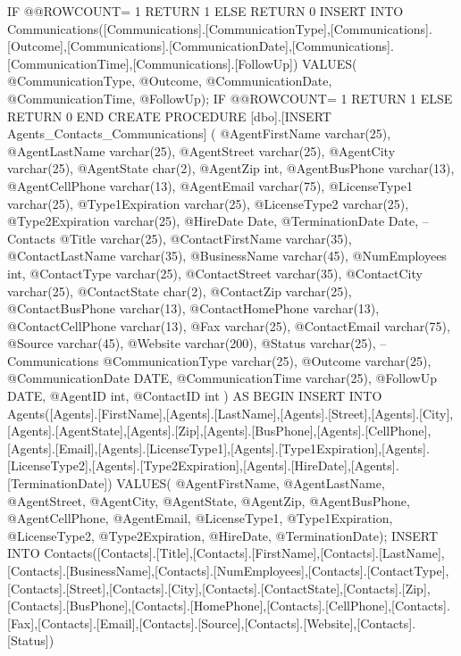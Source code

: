 	IF @@ROWCOUNT= 1
				RETURN 1
			ELSE
				RETURN 0
INSERT INTO	Communications([Communications].[CommunicationType],[Communications].[Outcome],[Communications].[CommunicationDate],[Communications].[CommunicationTime],[Communications].[FollowUp])	
	VALUES(				   @CommunicationType,                  @Outcome,                  @CommunicationDate,                  @CommunicationTime,                  @FollowUp);             			
			IF @@ROWCOUNT= 1
				RETURN 1
			ELSE
				RETURN 0
END
CREATE PROCEDURE [dbo].[INSERT Agents_Contacts_Communications]
(	
	@AgentFirstName varchar(25),
	@AgentLastName varchar(25),
	@AgentStreet varchar(25),
	@AgentCity varchar(25),
	@AgentState char(2),
	@AgentZip int,
	@AgentBusPhone varchar(13),
	@AgentCellPhone varchar(13),
	@AgentEmail varchar(75),
	@LicenseType1 varchar(25),
	@Type1Expiration varchar(25),
	@LicenseType2 varchar(25),
	@Type2Expiration varchar(25),
	@HireDate Date,
	@TerminationDate Date,
	--Contacts
	@Title varchar(25),
    @ContactFirstName varchar(35),
    @ContactLastName varchar(35),
    @BusinessName varchar(45),
    @NumEmployees int,
    @ContactType varchar(25),
    @ContactStreet varchar(35),
    @ContactCity varchar(25),
    @ContactState char(2),
    @ContactZip varchar(25),
    @ContactBusPhone varchar(13),
    @ContactHomePhone varchar(13),
    @ContactCellPhone varchar(13),
    @Fax varchar(25),
    @ContactEmail varchar(75),
    @Source varchar(45),
    @Website varchar(200),
    @Status varchar(25),
	--Communications
	@CommunicationType varchar(25),	
	@Outcome varchar(25),
	@CommunicationDate DATE,
	@CommunicationTime varchar(25),
	@FollowUp DATE,
	@AgentID int,
	@ContactID int
) AS BEGIN
INSERT INTO Agents([Agents].[FirstName],[Agents].[LastName],[Agents].[Street],[Agents].[City],[Agents].[AgentState],[Agents].[Zip],[Agents].[BusPhone],[Agents].[CellPhone],[Agents].[Email],[Agents].[LicenseType1],[Agents].[Type1Expiration],[Agents].[LicenseType2],[Agents].[Type2Expiration],[Agents].[HireDate],[Agents].[TerminationDate])			
	VALUES(		   @AgentFirstName,     @AgentLastName,     @AgentStreet,     @AgentCity,     @AgentState,          @AgentZip,     @AgentBusPhone,     @AgentCellPhone,     @AgentEmail,     @LicenseType1,          @Type1Expiration,          @LicenseType2,          @Type2Expiration,          @HireDate,          @TerminationDate);
INSERT INTO Contacts([Contacts].[Title],[Contacts].[FirstName],[Contacts].[LastName],[Contacts].[BusinessName],[Contacts].[NumEmployees],[Contacts].[ContactType],[Contacts].[Street],[Contacts].[City],[Contacts].[ContactState],[Contacts].[Zip],[Contacts].[BusPhone],[Contacts].[HomePhone],[Contacts].[CellPhone],[Contacts].[Fax],[Contacts].[Email],[Contacts].[Source],[Contacts].[Website],[Contacts].[Status])	
